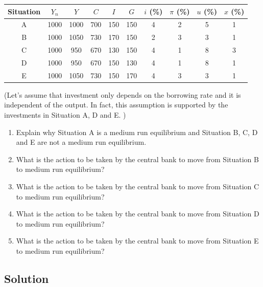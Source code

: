 \documentclass[12pt]{article}
\begin{document}
\begin{center}
\renewcommand{\arraystretch}{1.25}
\begin{tabular}{|c|c|c|c|c|c|c|c|c|c|}
\hline
\textbf{Situation} & \(Y_n\) & \(Y\) & \(C\) & \(I\) & \(G\) & \(i\) (\%) & \(\pi\) (\%) & \(u\) (\%) & \(x\) (\%) \\
\hline
A & 1000 & 1000 & 700 & 150 & 150 & 4 & 2 & 5 & 1 \\
B & 1000 & 1050 & 730 & 170 & 150 & 2 & 3 & 3 & 1 \\
C & 1000 & 950 & 670 & 130 & 150 & 4 & 1 & 8 & 3 \\
D & 1000 & 950 & 670 & 150 & 130 & 4 & 1 & 8 & 1 \\
E & 1000 & 1050 & 730 & 150 & 170 & 4 & 3 & 3 & 1 \\
\hline
\end{tabular}
\end{center}

(Let’s assume that investment only depends on the borrowing rate and it is independent of the output. In fact, this assumption is supported by the investments in Situation A, D and E. )

\begin{enumerate}[label=(\alph*)]
    \item Explain why Situation A is a medium run equilibrium and Situation B, C, D and E are not a medium run equilibrium.
    \item What is the action to be taken by the central bank to move from Situation B to medium run equilibrium?
    \item What is the action to be taken by the central bank to move from Situation C to medium run equilibrium?
    \item What is the action to be taken by the central bank to move from Situation D to medium run equilibrium?
    \item What is the action to be taken by the central bank to move from Situation E to medium run equilibrium?
\end{enumerate}

\newpage
\subsection{Solution}
\end{document}
